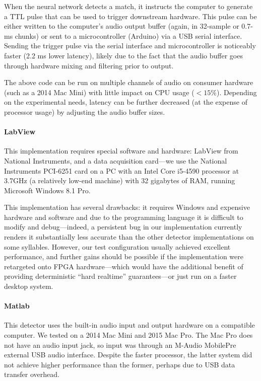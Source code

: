 \documentclass[10pt,letterpaper]{article}
\renewcommand{\subsubsection}[1]{\paragraph{#1}}
\begin{document}
When the neural network detects a match, it instructs the computer to
generate a TTL pulse that can be used to trigger downstream hardware.
This pulse can be either written to the computer's audio output buffer (again, in
32-sample or 0.7-ms chunks) or sent to a microcontroller (Arduino) via
a USB serial interface. Sending the trigger pulse via the serial
interface and microcontroller is noticeably faster (2.2 ms lower
latency), likely due to the fact that the audio buffer goes through
hardware mixing and filtering prior to output.

The above code can be run on multiple channels of audio on 
consumer hardware (such as a 2014 Mac Mini) with little impact
on CPU usage ($<15\%$). Depending on the experimental needs, latency
can be further decreased (at the expense of processor usage) by
adjusting the audio buffer sizes.

\subsubsection{LabView}

This implementation requires special software and hardware: LabView from National Instruments, and a data acquisition card---we use the National Instruments PCI-6251 card on a PC with an Intel Core i5-4590 processor at 3.7GHz (a relatively low-end machine) with 32 gigabytes of RAM, running Microsoft Windows 8.1 Pro.

This implementation has several drawbacks: it requires Windows and expensive hardware and software and due to the programming language it is difficult to modify and debug---indeed, a persistent bug in our implementation currently renders it substantially less accurate than the other detector implementations on some syllables. However, our test configuration usually achieved excellent performance, and further gains should be possible if the implementation were retargeted onto FPGA hardware---which would have the additional benefit of providing deterministic ``hard realtime'' guarantees---or just run on a faster desktop system.

\subsubsection{Matlab}

This detector uses the built-in audio input and output hardware on a compatible computer.  We tested on a 2014 Mac Mini and 2015 Mac Pro.  The Mac Pro does not have an audio input jack, so input was through an M-Audio MobilePre external USB audio interface.  Despite the faster processor, the latter system did not achieve higher performance than the former, perhaps due to USB data transfer overhead.
\end{document}
